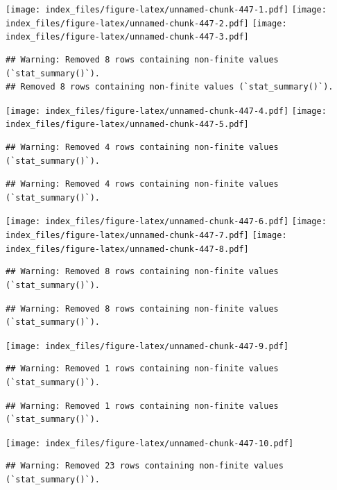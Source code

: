 \documentclass[
]{article}
\begin{document}
\texttt{[image: index\_files/figure-latex/unnamed-chunk-447-1.pdf]}
\texttt{[image: index\_files/figure-latex/unnamed-chunk-447-2.pdf]}
\texttt{[image: index\_files/figure-latex/unnamed-chunk-447-3.pdf]}

\begin{verbatim}
## Warning: Removed 8 rows containing non-finite values (`stat_summary()`).
## Removed 8 rows containing non-finite values (`stat_summary()`).
\end{verbatim}

\texttt{[image: index\_files/figure-latex/unnamed-chunk-447-4.pdf]}
\texttt{[image: index\_files/figure-latex/unnamed-chunk-447-5.pdf]}

\begin{verbatim}
## Warning: Removed 4 rows containing non-finite values (`stat_summary()`).
\end{verbatim}

\begin{verbatim}
## Warning: Removed 4 rows containing non-finite values (`stat_summary()`).
\end{verbatim}

\texttt{[image: index\_files/figure-latex/unnamed-chunk-447-6.pdf]}
\texttt{[image: index\_files/figure-latex/unnamed-chunk-447-7.pdf]}
\texttt{[image: index\_files/figure-latex/unnamed-chunk-447-8.pdf]}

\begin{verbatim}
## Warning: Removed 8 rows containing non-finite values (`stat_summary()`).
\end{verbatim}

\begin{verbatim}
## Warning: Removed 8 rows containing non-finite values (`stat_summary()`).
\end{verbatim}

\texttt{[image: index\_files/figure-latex/unnamed-chunk-447-9.pdf]}

\begin{verbatim}
## Warning: Removed 1 rows containing non-finite values (`stat_summary()`).
\end{verbatim}

\begin{verbatim}
## Warning: Removed 1 rows containing non-finite values (`stat_summary()`).
\end{verbatim}

\texttt{[image: index\_files/figure-latex/unnamed-chunk-447-10.pdf]}

\begin{verbatim}
## Warning: Removed 23 rows containing non-finite values (`stat_summary()`).
\end{verbatim}
\end{document}
